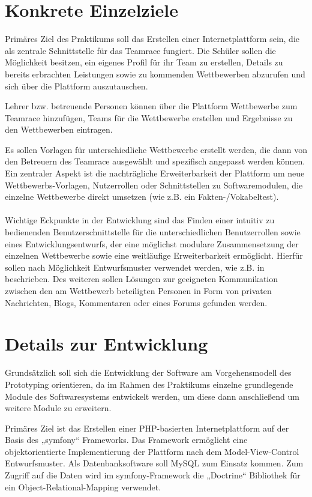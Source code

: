 \documentclass[11pt]{article}
\begin{document}
\section{Konkrete Einzelziele}

Primäres Ziel des Praktikums soll das Erstellen einer Internetplattform sein, die als zentrale Schnittstelle für das Teamrace fungiert. Die Schüler sollen die Möglichkeit besitzen, ein eigenes Profil für ihr Team zu erstellen, Details zu bereits erbrachten Leistungen sowie zu kommenden Wettbewerben abzurufen und sich über die Plattform auszutauschen. 

Lehrer bzw. betreuende Personen können über die Plattform Wettbewerbe zum Teamrace hinzufügen, Teams für die Wettbewerbe erstellen und Ergebnisse zu den Wettbewerben eintragen.

Es sollen Vorlagen für unterschiedliche Wettbewerbe erstellt werden, die dann von den Betreuern des Teamrace ausgewählt und spezifisch angepasst werden können.
Ein zentraler Aspekt ist die nachträgliche Erweiterbarkeit der Plattform um neue Wettbewerbs-Vorlagen, Nutzerrollen oder Schnittstellen zu Softwaremodulen, die einzelne Wettbewerbe direkt umsetzen (wie z.B. ein Fakten-/Vokabeltest).
\\\\
Wichtige Eckpunkte in der Entwicklung sind das Finden einer intuitiv zu bedienenden Benutzerschnittstelle für die unterschiedlichen Benutzerrollen sowie eines Entwicklungsentwurfs, der eine möglichst modulare Zusammensetzung der einzelnen Wettbewerbe sowie eine weitläufige Erweiterbarkeit ermöglicht. Hierfür sollen nach Möglichkeit Entwurfsmuster verwendet werden, wie z.B. in 
\cite{entwurfsmuster}
beschrieben. Des weiteren sollen Lösungen zur geeigneten Kommunikation zwischen den am Wettbewerb beteiligten Personen in Form von privaten Nachrichten, Blogs, Kommentaren oder eines Forums gefunden werden.

\section{Details zur Entwicklung}

Grundsätzlich soll sich die Entwicklung der Software am Vorgehensmodell des Prototyping orientieren, da im Rahmen des Praktikums einzelne grundlegende Module des Softwaresystems entwickelt werden, um diese dann anschließend um weitere Module zu erweitern.

Primäres Ziel ist das Erstellen einer PHP-basierten Internetplattform auf der Basis des „symfony“ Frameworks. \cite{symfony} Das Framework ermöglicht eine objektorientierte Implementierung der Plattform nach dem Model-View-Control Entwurfsmuster. 
Als Datenbanksoftware soll MySQL zum Einsatz kommen. Zum Zugriff auf die Daten wird im symfony-Framework die „Doctrine“ Bibliothek \cite{doctrine} für ein Object-Relational-Mapping verwendet.
\end{document}
